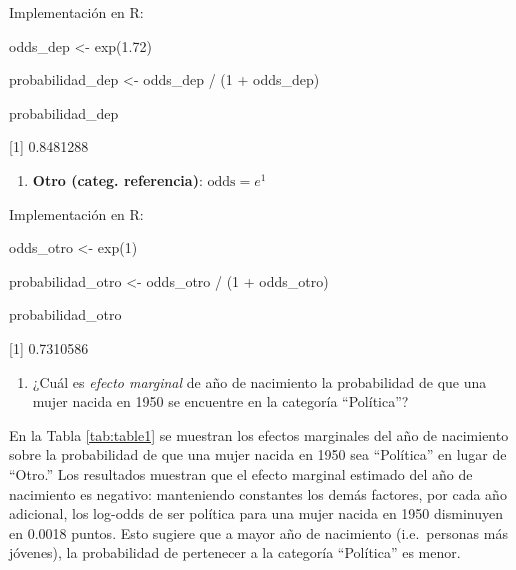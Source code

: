 \documentclass[
  12pt,
  a4paper,
]{article}
\newenvironment{Shaded}{\begin{snugshade}}{\end{snugshade}}
\newcommand{\DecValTok}[1]{\textcolor[rgb]{0.00,0.00,0.81}{#1}}
\newcommand{\FloatTok}[1]{\textcolor[rgb]{0.00,0.00,0.81}{#1}}
\newcommand{\FunctionTok}[1]{\textcolor[rgb]{0.00,0.00,0.00}{#1}}
\newcommand{\NormalTok}[1]{#1}
\newcommand{\OtherTok}[1]{\textcolor[rgb]{0.56,0.35,0.01}{#1}}
\newcommand{\SpecialCharTok}[1]{\textcolor[rgb]{0.00,0.00,0.00}{#1}}
\providecommand{\tightlist}{%
  \setlength{\itemsep}{0pt}\setlength{\parskip}{0pt}}
\begin{document}
Implementación en R:

\begin{Shaded}
\begin{Highlighting}[]
\NormalTok{odds\_dep }\OtherTok{\textless{}{-}} \FunctionTok{exp}\NormalTok{(}\FloatTok{1.72}\NormalTok{)}

\NormalTok{probabilidad\_dep }\OtherTok{\textless{}{-}}\NormalTok{ odds\_dep }\SpecialCharTok{/}\NormalTok{ (}\DecValTok{1} \SpecialCharTok{+}\NormalTok{ odds\_dep)}

\NormalTok{probabilidad\_dep}
\end{Highlighting}
\end{Shaded}

{[}1{]} 0.8481288

\begin{enumerate}
\def\labelenumi{\roman{enumi}.}
\setcounter{enumi}{3}
\tightlist
\item
  \textbf{Otro (categ. referencia)}: \(\text{odds}= e^{1}\)
\end{enumerate}

Implementación en R:

\begin{Shaded}
\begin{Highlighting}[]
\NormalTok{odds\_otro }\OtherTok{\textless{}{-}} \FunctionTok{exp}\NormalTok{(}\DecValTok{1}\NormalTok{)}

\NormalTok{probabilidad\_otro }\OtherTok{\textless{}{-}}\NormalTok{ odds\_otro }\SpecialCharTok{/}\NormalTok{ (}\DecValTok{1} \SpecialCharTok{+}\NormalTok{ odds\_otro)}

\NormalTok{probabilidad\_otro}
\end{Highlighting}
\end{Shaded}

{[}1{]} 0.7310586

\begin{enumerate}
\def\labelenumi{\alph{enumi})}
\setcounter{enumi}{4}
\tightlist
\item
  ¿Cuál es \emph{efecto marginal} de año de nacimiento la probabilidad de que una mujer nacida en 1950 se encuentre en la categoría ``Política''?
\end{enumerate}

En la Tabla \ref{tab:table1} se muestran los efectos marginales del año de nacimiento sobre la probabilidad de que una mujer nacida en 1950 sea ``Política'' en lugar de ``Otro.'' Los resultados muestran que el efecto marginal estimado del año de nacimiento es negativo: manteniendo constantes los demás factores, por cada año adicional, los log-odds de ser política para una mujer nacida en 1950 disminuyen en 0.0018 puntos. Esto sugiere que a mayor año de nacimiento (i.e.~personas más jóvenes), la probabilidad de pertenecer a la categoría ``Política'' es menor.
\end{document}

